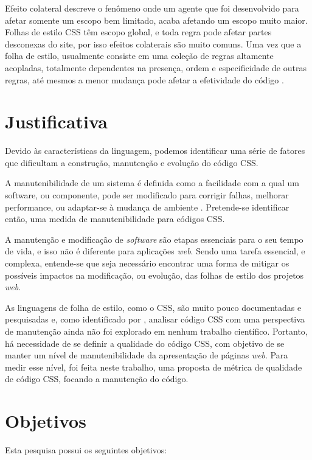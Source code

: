 Efeito colateral descreve o fenômeno onde um agente que foi desenvolvido para afetar somente um escopo bem limitado, acaba afetando um escopo muito maior. Folhas de estilo CSS têm escopo global, e toda regra pode afetar partes desconexas do site, por isso efeitos colaterais são muito comuns. Uma vez que a folha de estilo, usualmente consiste em uma coleção de regras altamente acopladas, totalmente dependentes na presença, ordem e especificidade de outras regras, até mesmos a menor mudança pode afetar a efetividade do código \cite{Walton:2015}.

\section{Justificativa}

Devido às características da linguagem, podemos identificar uma série de fatores que dificultam a construção, manutenção e evolução do código CSS. 

A manutenibilidade de um sistema é definida como a facilidade com a qual um software, ou componente, pode ser modificado para corrigir falhas, melhorar performance, ou adaptar-se à mudança de ambiente \cite{Ieee1990}. Pretende-se identificar então, uma medida de manutenibilidade para códigos CSS.

A manutenção e modificação de \textit{software} são etapas essenciais para o seu tempo de vida, e isso não é diferente para aplicações \textit{web}. Sendo uma tarefa essencial, e complexa, entende-se que seja necessário encontrar uma forma de mitigar os possíveis impactos na modificação, ou evolução, das folhas de estilo dos projetos \textit{web}.

As linguagens de folha de estilo, como o CSS, são muito pouco documentadas e pesquisadas \cite{Marden1999,Quint2007,Geneves2012} e, como identificado por , analisar código CSS com uma perspectiva de manutenção ainda não foi explorado em nenhum trabalho científico. Portanto, há necessidade de se definir a qualidade do código CSS, com objetivo de se manter um nível de manutenibilidade da apresentação de páginas \textit{web}. Para medir esse nível, foi feita neste trabalho, uma proposta de métrica de qualidade de código CSS, focando a manutenção do código.

\section{Objetivos}
Esta pesquisa possui os seguintes objetivos:

